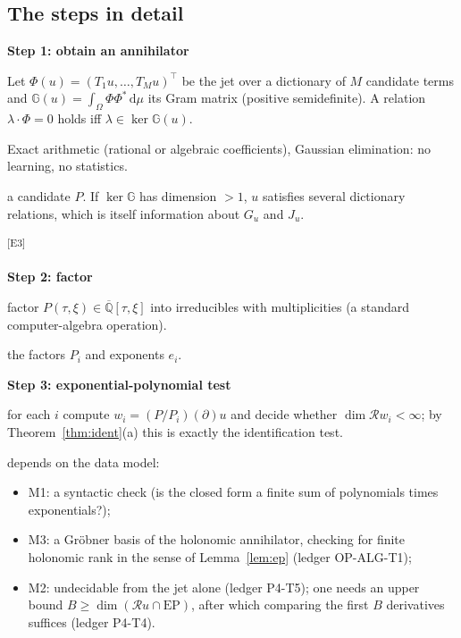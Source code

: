 \documentclass[11pt,a4paper]{article}
\theoremstyle{definition}
\newcommand{\led}[1]{\textcolor{cG}{\textsf{\footnotesize(ledger #1)}}}
\newcommand{\edmark}[1]{\textsuperscript{\textcolor{cB}{\textsf{[#1]}}}}
\newcommand{\stepblock}[2]{\par\Needspace{6\baselineskip}\medskip\noindent\textbf{\sffamily Step #1: #2}\par\nopagebreak\smallskip}
\newcommand{\EP}{\mathrm{EP}}
\newcommand{\ring}{\mathcal{R}}
\newcommand{\dd}{\,\mathrm{d}}
\DeclareMathOperator{\dimc}{dim}
\begin{document}
\subsection{The steps in detail}
\stepblock{1}{obtain an annihilator}
\begin{description}[nosep,leftmargin=2.6cm,labelwidth=2.4cm]
\item[Does] Let $\Phi(u)=(T_1u,\dots,T_Mu)^{\top}$ be the jet over a dictionary of $M$ candidate terms and $\mathbb G(u)=\int_\Omega\Phi\Phi^{*}\dd\mu$ its Gram matrix (positive semidefinite). A relation $\lambda\cdot\Phi=0$ holds iff $\lambda\in\ker\mathbb G(u)$.
\item[How] Exact arithmetic (rational or algebraic coefficients), Gaussian elimination: no learning, no statistics.
\item[Returns] a candidate $P$. If $\ker\mathbb G$ has dimension $>1$, $u$ satisfies several dictionary relations, which is itself information about $G_u$ and $J_u$.
\end{description}
\edmark{E3}

\stepblock{2}{factor}
\begin{description}[nosep,leftmargin=2.6cm,labelwidth=2.4cm]
\item[Does] factor $P(\tau,\xi)\in\overline{\mathbb Q}[\tau,\xi]$ into irreducibles with multiplicities (a standard computer-algebra operation).
\item[Returns] the factors $P_i$ and exponents $e_i$.
\end{description}

\stepblock{3}{exponential-polynomial test}
\begin{description}[nosep,leftmargin=2.6cm,labelwidth=2.4cm]
\item[Does] for each $i$ compute $w_i=(P/P_i)(\partial)u$ and decide whether $\dimc\ring w_i<\infty$; by Theorem~\ref{thm:ident}(a) this is exactly the identification test.
\item[How] depends on the data model:
 \begin{itemize}[nosep]
 \item M1: a syntactic check (is the closed form a finite sum of polynomials times exponentials?);
 \item M3: a Gr\"obner basis of the holonomic annihilator, checking for finite holonomic rank in the sense of Lemma~\ref{lem:ep} \led{OP-ALG-T1};
 \item M2: undecidable from the jet alone \led{P4-T5}; one needs an upper bound $B\ge\dimc(\ring u\cap\EP)$, after which comparing the first $B$ derivatives suffices \led{P4-T4}.
 \end{itemize}
\end{description}
\end{document}

